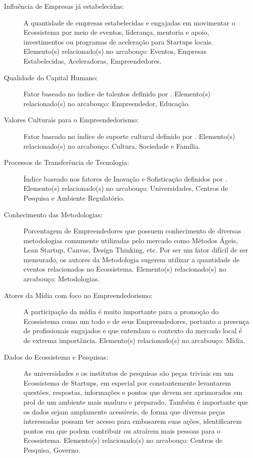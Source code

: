 \begin{apendicesenv}
\begin{description}
  \item [Influência de Empresas já estabelecidas:] A quantidade de empresas estabelecidas e engajadas em movimentar o Ecossistema por meio de eventos, líderança, mentoria e apoio, investimentos ou programas de aceleração para Startups locais. Elemento(s) relacionado(s) no arcabouço: Eventos, Empresas Estabelecidas, Aceleradoras, Empreendedores.

  \item [Qualidade do Capital Humano:] Fator baseado no índice de talentos definido por . Elemento(s) relacionado(s) no arcabouço: Empreendedor, Educação.

  \item [Valores Culturais para o Empreendedorismo:] Fator baseado no índice de suporte cultural definido por . Elemento(s) relacionado(s) no arcabouço: Cultura, Sociedade e Família.

  \item [Processos de Transferência de Tecnologia:] Índice baseado nos fatores de Inovação e Sofisticação definidos por . Elemento(s) relacionado(s) no arcabouço: Universidades, Centros de Pesquisa e Ambiente Regulatório.

  \item [Conhecimento das Metodologias:] Porcentagem de Empreendedores que possuem conhecimento de diversas metodologias comumente utilizadas pelo mercado como Métodos Ágeis, Lean Startup, Canvas, Design Thinking, etc. Por ser um fator difícil de ser mensurado, os autores da Metodologia sugerem utilizar a quantidade de eventos relacionados no Ecossistema. Elemento(s) relacionado(s) no arcabouço: Metodologias.

  \item [Atores da Mídia com foco no Empreendedorismo:] A participação da mídia é muito importante para a promoção do Ecossistema como um todo e de seus Empreendedores, portanto a presença de profissionais engajados e que entendam o contexto do mercado local é de extrema importância. Elemento(s) relacionado(s) no arcabouço: Mídia.

  \item [Dados do Ecossistema e Pesquisas:] As universidades e os institutos de pesquisas são peças triviais em um Ecossistema de Startups, em especial por constantemente levantarem questões, respostas, informações e pontos que devem ser aprimorados em prol de um ambiente mais maduro e preparado. Também é importante que os dados sejam amplamente acessíveis, de forma que diversas peças interessadas possam ter acesso para embasarem suas ações, identificarem pontos em que podem contribuir ou atraírem mais pessoas para o Ecossistema. Elemento(s) relacionado(s) no arcabouço: Centros de Pesquisa, Governo.
  

\end{description}
\end{apendicesenv}
